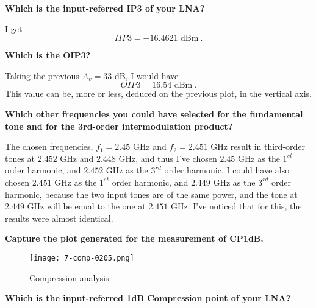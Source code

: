 \begin{pexbox}{}
   \noindent \textbf{Which is the input-referred IP3 of your LNA?}
\end{pexbox}

   \noindent I get
   \begin{equation}
     IIP3 = -16.4621 \text{ dBm} \ .
   \end{equation}

\begin{pexbox}{}
   \noindent \textbf{Which is the OIP3?}
\end{pexbox}

   \noindent Taking the previous $A_v = 33$ dB, I would have
   \begin{equation}
      OIP3 = 16.54 \text{ dBm} \ .
   \end{equation}
   \noindent This value can be, more or less, deduced on the previous plot, in the vertical axis.

\begin{pexbox}{}
   \noindent \textbf{Which other frequencies you could have selected for the fundamental tone and for the 3rd-order intermodulation product?}
\end{pexbox}

   \noindent The chosen frequencies, $f_1 = 2.45$ GHz and $f_2 = 2.451$ GHz result in third-order tones at $2.452$ GHz and $2.448$ GHz, and thus I've chosen $2.45$ GHz as the $1^{st}$ order harmonic, and $2.452$ GHz as the $3^{rd}$ order harmonic. I could have also chosen $2.451$ GHz as the $1^{st}$ order harmonic, and $2.449$ GHz as the $3^{rd}$ order harmonic, because the two input tones are of the same power, and the tone at $2.449$ GHz will be equal to the one at $2.451$ GHz. I've noticed that for this, the results were almost identical.







\begin{pexbox}{}
   \noindent \textbf{Capture the plot generated for the measurement of CP1dB.}
\end{pexbox}

\begin{figure} [H] \centering
   \texttt{[image: 7-comp-0205.png]}
   \caption{Compression analysis}
\end{figure}


\begin{pexbox}{}
   \noindent \textbf{Which is the input-referred 1dB Compression point of your LNA?}
\end{pexbox}

